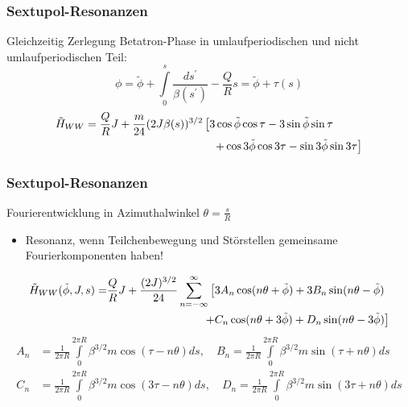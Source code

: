 \documentclass[hyperref={pdfpagelabels=false}]{beamer}
\begin{document}
\begin{frame}
\frametitle{Sextupol-Resonanzen}
Gleichzeitig Zerlegung Betatron-Phase in umlaufperiodischen und nicht umlaufperiodischen Teil:
\begin{equation*}
\phi = \tilde{\phi} + \int\limits_0^s \frac{ds^\prime}{\beta(s^\prime)} - \frac{Q}{R}s = \tilde{\phi} + \tau(s)
\end{equation*}
\pause
\vspace*{.4cm}
\begin{align*}
\tilde{H}_{WW} &= \frac{Q}{R} J + \frac{m}{24}(2J\beta(s))^{3/2} \left[3\cos\tilde{\phi}\cos\tau - 3 \sin\tilde{\phi}\sin\tau\right.\\&\hspace*{4cm}\left. + \cos 3\tilde{\phi}\cos3\tau - \sin 3\tilde{\phi}\sin 3\tau\right]
\end{align*}
\end{frame}

\begin{frame}
\frametitle{Sextupol-Resonanzen}
Fourierentwicklung in Azimuthalwinkel $\theta = \frac{s}{R}$
\begin{itemize}
\item Resonanz, wenn Teilchenbewegung und Störstellen gemeinsame Fourierkomponenten haben!
\end{itemize}
\pause
\vspace*{2mm}
\begin{align*}
\tilde{H}_{WW}(\tilde{\phi},J,s) = &\frac{Q}{R}J + \frac{(2J)^{3/2}}{24} \sum\limits_{n=-\infty}^\infty \left[ 3 A_n \cos(n\theta + \tilde{\phi}) + 3 B_n \sin(n\theta - \tilde{\phi})\right.\\&\hspace*{3cm}\left. + C_n \cos(n\theta + 3\tilde{\phi}) + D_n \sin(n\theta - 3\tilde{\phi})\right]
\end{align*}
\vspace*{-2mm}
\pause
\small{
\begin{align*}
A_n &= \frac{1}{2\pi R} \int\limits_0^{2\pi R} \beta^{3/2} m \cos(\tau -n\theta) ds, \quad B_n = \frac{1}{2\pi R} \int\limits_0^{2\pi R} \beta^{3/2} m \sin(\tau +n\theta) ds\\
C_n &= \frac{1}{2\pi R} \int\limits_0^{2\pi R} \beta^{3/2} m \cos(3\tau -n\theta) ds, \quad D_n = \frac{1}{2\pi R} \int\limits_0^{2\pi R} \beta^{3/2} m \sin(3\tau +n\theta) ds\\
\end{align*}}
\end{frame}
\end{document}
